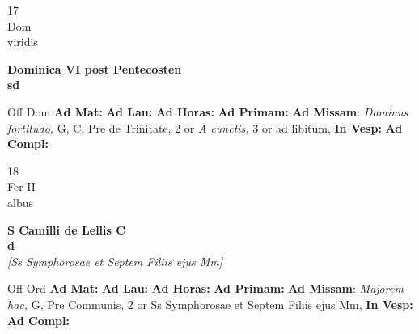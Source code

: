 \documentclass[10pt, openany]{book}
\begin{document}
    \begin{center}
        \begin{minipage}{3.5in}
            \vspace{2em}
            \begin{minipage}{0.5in}
                {\Huge 17} \\
                {\normalsize Dom} \\
                {\normalsize viridis}
            \end{minipage}
            \begin{minipage}{3.0in}
                \textbf{ \large Dominica VI post Pentecosten \\
                \textnormal{\normalsize sd}} \\ 
            \end{minipage}
            \begin{justify}Off Dom
                \textbf{Ad Mat: }
                \textbf{Ad Lau: }
                \textbf{Ad Horas: }
                \textbf{Ad Primam: }\textbf{Ad Missam}: \textit{Dominus fortitudo,} G, C, Pre de Trinitate, 2 or \textit{A cunctis,} 3 or ad libitum,  
                \textbf{In Vesp: }
                \textbf{Ad Compl: }
            \end{justify}
        \end{minipage}
    \end{center}

    \begin{center}
        \begin{minipage}{3.5in}
            \vspace{2em}
            \begin{minipage}{0.5in}
                {\Huge 18} \\
                {\normalsize Fer II} \\
                {\normalsize albus}
            \end{minipage}
            \begin{minipage}{3.0in}
                \textbf{ \large S Camilli de Lellis C \\
                \textnormal{\normalsize d}} \\ \textit{[Ss Symphorosae et Septem Filiis ejus Mm]} \\ 
            \end{minipage}
            \begin{justify}Off Ord
                \textbf{Ad Mat: }
                \textbf{Ad Lau: }
                \textbf{Ad Horas: }
                \textbf{Ad Primam: }\textbf{Ad Missam}: \textit{Majorem hac,} G, Pre Communis, 2 or Ss Symphorosae et Septem Filiis ejus Mm,  
                \textbf{In Vesp: }
                \textbf{Ad Compl: }
            \end{justify}
        \end{minipage}
    \end{center}
\end{document}
